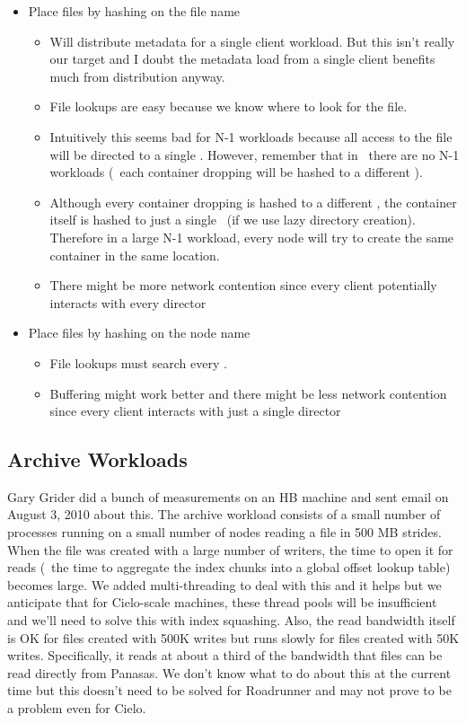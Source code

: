 \documentclass[10pt]{article}
\begin{document}
\begin{itemize}
\item{Place files by hashing on the file name}
\begin{itemize}
\item{Will distribute metadata for
a single client workload.  But this isn't really our target and I doubt the
metadata load from a single client benefits much from distribution anyway.
}
\item{File lookups are easy because we know where to look for the file.}
\item{Intuitively this seems bad for N-1 workloads because all access to the
file will be directed to a single \store.  However, remember that in \plfs\
there are no N-1 workloads (\ie\ each container dropping will be hashed to
a different \store).}
\item{Although every container dropping is hashed to a different \store, the
container itself is hashed to just a single \store\
(if we use lazy directory creation).  Therefore in a large N-1 workload,
every node will try to create the same container in the same location.}
\item{There might be more network contention since every client potentially
interacts with every director}
\end{itemize}
\item{Place files by hashing on the node name}
\begin{itemize}
\item{File lookups must search every \store.} 
\item{Buffering might work better and there might be less network contention
since every client interacts with just a single director} 
\end{itemize}
\end{itemize}

\subsection{Archive Workloads}

Gary Grider did a bunch of measurements on an HB machine and sent email on
August 3, 2010 about this.  The archive workload consists of a small number of
processes running on a small number of nodes reading a file in 500 MB strides.
When the file was created with a large number of writers, the time to open it
for reads (\ie\ the time to aggregate the index chunks into a global offset
lookup table) becomes large.  We added multi-threading to deal with this and
it helps but we anticipate that for Cielo-scale machines, these thread pools
will be insufficient and we'll need to solve this with index squashing.  Also,
the read bandwidth itself is OK for files created with 500K writes but runs
slowly for files created with 50K writes.  Specifically, it reads at about
a third of the bandwidth that files can be read directly from Panasas.  We
don't know what to do about this at the current time but this doesn't need
to be solved for Roadrunner and may not prove to be a problem even for Cielo.
 
\end{document}
